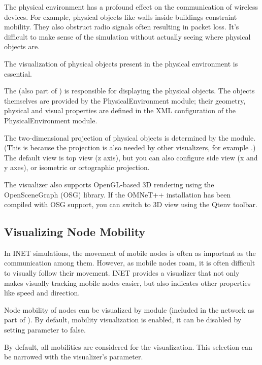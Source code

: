 The physical environment has a profound effect on the communication of wireless
devices. For example, physical objects like walls inside buildings constraint
mobility. They also obstruct radio signals often resulting in packet loss. It's
difficult to make sense of the simulation without actually seeing where physical
objects are.

The visualization of physical objects present in the physical environment is
essential.

The  (also part of ) is
responsible for displaying the physical objects. The objects themselves are
provided by the PhysicalEnvironment module; their geometry, physical and visual
properties are defined in the XML configuration of the PhysicalEnvironment
module.

The two-dimensional projection of physical objects is determined by the
 module. (This is because the projection is also needed by
other visualizers, for example .) The default view is top view
(z axis), but you can also configure side view (x and y axes), or isometric or
ortographic projection.

The visualizer also supports OpenGL-based 3D rendering using the OpenSceneGraph
(OSG) library. If the OMNeT++ installation has been compiled with OSG
support, you can switch to 3D view using the Qtenv toolbar.

\subsection{Visualizing Node Mobility}
\label{sec:visualization:node-mobility}

In INET simulations, the movement of mobile nodes is often as important as the
communication among them. However, as mobile nodes roam, it is often difficult
to visually follow their movement. INET provides a visualizer that not only
makes visually tracking mobile nodes easier, but also indicates other properties
like speed and direction.

Node mobility of nodes can be visualized by  module
(included in the network as part of ). By default,
mobility visualization is enabled, it can be disabled by setting
 parameter to false.

By default, all mobilities are considered for the visualization. This selection
can be narrowed with the visualizer's  parameter.

